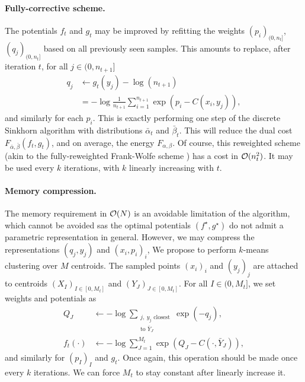 \paragraph{Fully-corrective scheme.} The potentials $f_t$ and $g_t$ may be
improved by refitting the weights $(p_i)_{(0, n_t]}$, $(q_j)_{(0, n_t]}$ based
on all previously seen samples. This
amounts to replace, after iteration $t$, for all $j \in (0, n_{t+1}]$
\begin{align}
    q_j &\gets g_t(y_j) - \log(n_{t+1}) \\
    &= - \log \frac{1}{n_{t+1}} 
    \sum_{i=1}^{n_{t+1}} \exp(p_i - C(x_i, y_j)),
\end{align}
and similarly for each $p_i$. This is exactly performing one step of the
 discrete Sinkhorn algorithm with distributions $\bar \alpha_t$ and $\bar
 \beta_t$. This will reduce the dual cost $F_{ \bar \alpha, \bar \beta}(f_t,
 g_t)$, and on average, the energy $F_{\alpha, \beta}$. Of course, this
 reweighted scheme (akin to the fully-reweighted Frank-Wolfe scheme \cite{}) has
 a cost in $\mathcal{O}(n_t^2)$. It may be used every $k$ iterations, with $k$ linearly
 increasing with $t$.

\paragraph{Memory compression.} The memory requirement in $\mathcal{O}(N)$ is an
avoidable limitation of the algorithm, which cannot be avoided sas the optimal
potentials $(f^\star, g^\star)$ do not admit a parametric representation in
general. However, we may compress the representations $(q_j, y_j)$ and $(x_i,
p_i)_i$, We propose to perform $k$-means clustering over $M$ centroids. The
sampled points $(x_i)_i$ and $(y_j)_j$ are attached to centroids ${(X_I)}_{I \in
[0,M_t]}$ and ${(Y_J)}_{J \in [0,M_t]}$. For all $I \in (0, M_t]$, we set
weights and potentials as
\begin{align}
    Q_J &\gets - \log \sum_{\substack{j,\:y_j \text{ closest}\\\text{to } \bar Y_J}}
     \exp(-q_j),\\
    f_t(\cdot) &\gets - \log\sum_{J=1}^{M_t} \exp(Q_J - C(\cdot, \bar Y_J)),
\end{align}
and similarly for $(p_I)_I$ and $g_t$. Once again, this operation should be made
once every $k$ iterations. We can force $M_t$ to stay constant after linearly increase it.

